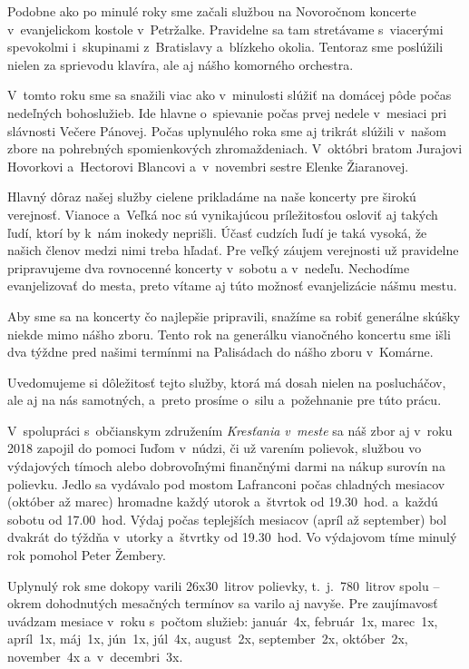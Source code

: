 Podobne ako po minulé roky sme začali službou na Novoročnom koncerte v~evanjelickom kostole v~Petržalke. Pravidelne sa tam stretávame s~viacerými spevokolmi i~skupinami z~Bratislavy a~blízkeho okolia. Tentoraz sme poslúžili nielen za sprievodu klavíra, ale aj nášho komorného orchestra.

V~tomto roku sme sa snažili viac ako v~minulosti slúžiť na domácej pôde počas nedeľných bohoslužieb. Ide hlavne o~spievanie počas prvej nedele v~mesiaci pri slávnosti Večere Pánovej. Počas uplynulého roka sme aj trikrát slúžili v~našom zbore na pohrebných spomienkových zhromaždeniach. V~októbri bratom Jurajovi Hovorkovi a~Hectorovi Blancovi a~v~novembri sestre Elenke Žiaranovej.

Hlavný dôraz našej služby cielene prikladáme na naše koncerty pre širokú verejnosť. Vianoce a~Veľká noc sú vynikajúcou príležitosťou osloviť aj takých ľudí, ktorí by k~nám inokedy neprišli. Účasť cudzích ľudí je taká vysoká, že našich členov medzi nimi treba hľadať.  Pre veľký záujem verejnosti už pravidelne pripravujeme dva rovnocenné koncerty v~sobotu a v~nedeľu. Nechodíme evanjelizovať do mesta, preto vítame aj túto možnosť evanjelizácie nášmu mestu.

Aby sme sa na koncerty čo najlepšie pripravili, snažíme sa robiť generálne skúšky niekde mimo nášho zboru. Tento rok na generálku vianočného koncertu sme išli dva týždne pred našimi termínmi na Palisádach do nášho zboru v~Komárne.

Uvedomujeme si dôležitosť tejto služby, ktorá má dosah nielen na poslucháčov, ale aj na nás samotných, a~preto prosíme o~silu a~požehnanie pre túto prácu.



V~spolupráci s~občianskym združením {\it Kresťania v~meste} sa náš zbor aj v~roku 2018 zapojil do pomoci ľuďom v~núdzi, či už varením polievok, službou vo výdajových tímoch alebo dobrovoľnými finančnými darmi na nákup surovín na polievku. Jedlo sa vydávalo pod mostom Lafranconi počas chladných mesiacov (október až marec) hromadne každý utorok a~štvrtok od 19.30~hod. a~každú sobotu od 17.00~hod. Výdaj počas teplejších mesiacov (apríl až september) bol dvakrát do týždňa v~utorky a~štvrtky od 19.30~hod. Vo výdajovom tíme minulý rok pomohol Peter Žembery.

Uplynulý rok sme dokopy varili 26x30~litrov polievky, t.~j.~780~litrov spolu -- okrem dohodnutých mesačných termínov sa varilo aj navyše. Pre zaujímavosť uvádzam mesiace v~roku s~počtom služieb: január~4x, február~1x, marec~1x, apríl~1x, máj~1x, jún~1x, júl~4x, august~2x, september~2x, október~2x, november~4x a~v~decembri~3x.

